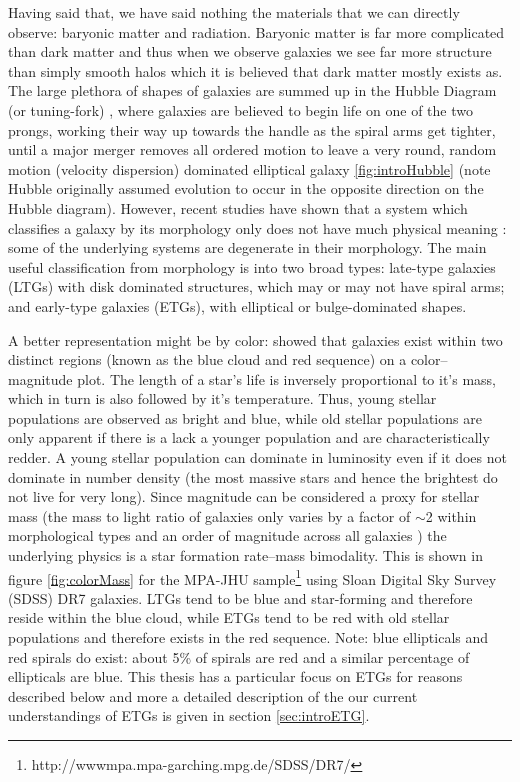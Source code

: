 Having said that, we have said nothing the materials that we can directly observe: baryonic matter and radiation. Baryonic matter is far more complicated than dark matter and thus when we observe galaxies we see far more structure than simply smooth halos which it is believed that dark matter mostly exists as. The large plethora of shapes of galaxies are summed up in the Hubble Diagram (or tuning-fork) \cite{Hubble1982, deVaucouleurs1959}, where galaxies are believed to begin life on one of the two prongs, working their way up towards the handle as the spiral arms get tighter, until a major merger removes all ordered motion to leave a very round, random motion (velocity dispersion) dominated elliptical galaxy \ref{fig:introHubble} (note Hubble originally assumed evolution to occur in the opposite direction on the Hubble diagram). However, recent studies have shown that a system which classifies a galaxy by its morphology only does not have much physical meaning \citep{Cappellari2011, Sanchez2011, Arnold2013, Bryant2014}: some of the underlying systems are degenerate in their morphology. The main useful classification from morphology is into two broad types: late-type galaxies (LTGs) with disk dominated structures, which may or may not have spiral arms; and early-type galaxies (ETGs), with elliptical or bulge-dominated shapes. 

A better representation might be by color: \citet{Baldry2004} showed that galaxies exist within two distinct regions (known as the blue cloud and red sequence) on a color--magnitude plot. The length of a star's life is inversely proportional to it's mass, which in turn is also followed by it's temperature. Thus, young stellar populations are observed as bright and blue, while old stellar populations are only apparent if there is a lack a younger population and are characteristically redder. A young stellar population can dominate in luminosity even if it does not dominate in number density (the most massive stars and hence the brightest do not live for very long). Since magnitude can be considered a proxy for stellar mass (the mass to light ratio of galaxies only varies by a factor of $\sim$2 within morphological types and an order of magnitude across all galaxies \citep{Faber1979}) the underlying physics is a star formation rate--mass bimodality. This is shown in figure \ref{fig:colorMass} for the MPA-JHU sample\footnote{http://wwwmpa.mpa-garching.mpg.de/SDSS/DR7/} using Sloan Digital Sky Survey (SDSS) DR7 galaxies. LTGs tend to be blue and star-forming and therefore reside within the blue cloud, while ETGs tend to be red with old stellar populations and therefore exists in the red sequence. Note: blue ellipticals and red spirals do exist: about 5\% of spirals are red \citep{Masters2010} and a similar percentage of ellipticals are blue. This thesis has a particular focus on ETGs for reasons described below and more a detailed description of the our current understandings of ETGs is given in section \ref{sec:introETG}. 

